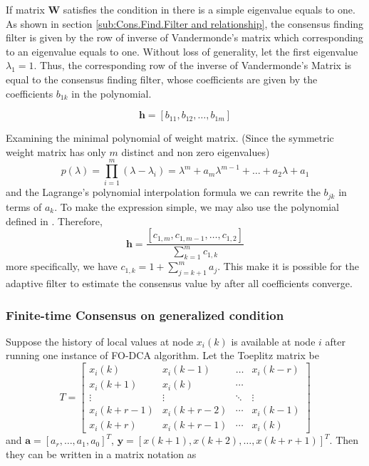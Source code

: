 If matrix $\mathbf{W}$ satisfies the condition in 
there is a simple eigenvalue equals to one. As shown in section \ref{sub:Cons.Find.Filter and relationship},
the consensus finding filter is given by the row of inverse of Vandermonde's
matrix which corresponding to an eigenvalue equals to one. Without
loss of generality, let the first eigenvalue $\lambda_{1}=1$. Thus,
the corresponding row of the inverse of Vandermonde's Matrix is equal
to the consensus finding filter, whose coefficients are given by the
coefficients $b_{1k}$ in the polynomial. 

\begin{equation}
\mathbf{h}=\left[b_{11},b_{12},\ldots,b_{1m}\right]\label{eq:Consensus Finding filter Entry}
\end{equation}


Examining the minimal polynomial of weight matrix. (Since the symmetric
weight matrix has only $m$ distinct and non zero eigenvalues) 
\begin{equation}
p(\lambda)=\prod_{i=1}^{m}\left(\lambda-\lambda_{i}\right)=\lambda^{m}+a_{m}\lambda^{m-1}+\ldots+a_{2}\lambda+a_{1}\label{eq:Polynomial of matrix}
\end{equation}
and the Lagrange's polynomial interpolation formula 
we can rewrite the $b_{jk}$ in terms of $a_{k}$. To make the expression
simple, we may also use the polynomial defined in .
Therefore, 
\begin{equation}
\mathbf{h}=\frac{\left[c_{1,m},c_{1,m-1},\ldots,c_{1,2}\right]}{\sum_{k=1}^{m}c_{1,k}}\label{eq:Consensus Find coeff. c}
\end{equation}
more specifically, we have $c_{1,k}=1+\sum_{j=k+1}^{m}a_{j}$. This
make it is possible for the adaptive filter to estimate the consensus
value by after all coefficients converge. 


\subsubsection{\label{sub:Finite-time-Consensus-on}Finite-time Consensus on generalized
condition}

Suppose the history of local values at node $x_{i}\left(k\right)$
is available at node $i$ after running one instance of FO-DCA algorithm.
Let the Toeplitz matrix be
\[
T=\left[\begin{array}{cccc}
x_{i}\left(k\right) & x_{i}\left(k-1\right) & \ldots & x_{i}\left(k-r\right)\\
x_{i}\left(k+1\right) & x_{i}\left(k\right) & \cdots\\
\vdots & \vdots & \ddots & \vdots\\
x_{i}\left(k+r-1\right) & x_{i}\left(k+r-2\right) & \cdots & x_{i}\left(k-1\right)\\
x_{i}\left(k+r\right) & x_{i}\left(k+r-1\right) & \cdots & x_{i}\left(k\right)
\end{array}\right]
\]
and $\mathbf{a}=\left[a_{r},\ldots,a_{1},a_{0}\right]^{T}$, $\mathbf{y}=\left[x\left(k+1\right),x\left(k+2\right),\ldots,x\left(k+r+1\right)\right]^{T}$.
Then they can be written in a matrix notation as

